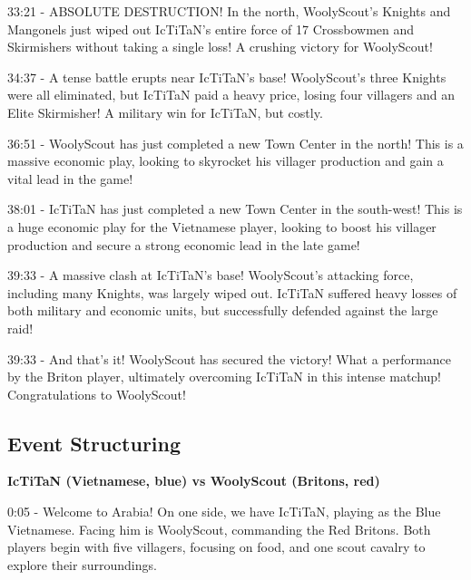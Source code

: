33:21 - ABSOLUTE DESTRUCTION! In the north, WoolyScout's Knights and Mangonels just wiped out IcTiTaN's entire force of 17 Crossbowmen and Skirmishers without taking a single loss! A crushing victory for WoolyScout! \par \vspace{1em}

34:37 - A tense battle erupts near IcTiTaN's base! WoolyScout's three Knights were all eliminated, but IcTiTaN paid a heavy price, losing four villagers and an Elite Skirmisher! A military win for IcTiTaN, but costly. \par \vspace{1em}

36:51 - WoolyScout has just completed a new Town Center in the north! This is a massive economic play, looking to skyrocket his villager production and gain a vital lead in the game! \par \vspace{1em}

38:01 - IcTiTaN has just completed a new Town Center in the south-west! This is a huge economic play for the Vietnamese player, looking to boost his villager production and secure a strong economic lead in the late game! \par \vspace{1em}

39:33 - A massive clash at IcTiTaN's base! WoolyScout's attacking force, including many Knights, was largely wiped out. IcTiTaN suffered heavy losses of both military and economic units, but successfully defended against the large raid! \par \vspace{1em}

39:33 - And that's it! WoolyScout has secured the victory! What a performance by the Briton player, ultimately overcoming IcTiTaN in this intense matchup! Congratulations to WoolyScout! \par \vspace{1em}

\subsection{Event Structuring}
\textbf{IcTiTaN (Vietnamese, blue) vs WoolyScout (Britons, red)}

0:05 - Welcome to Arabia! On one side, we have IcTiTaN, playing as the Blue Vietnamese. Facing him is WoolyScout, commanding the Red Britons. Both players begin with five villagers, focusing on food, and one scout cavalry to explore their surroundings. \par \vspace{1em}

